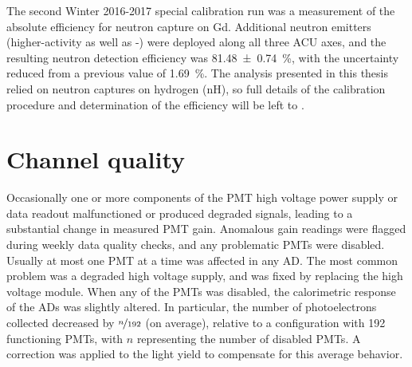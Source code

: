 The second Winter 2016-2017 special calibration run
was a measurement of the absolute efficiency for neutron capture on Gd.
Additional neutron emitters
(higher-activity \amc{} as well as -)
were deployed along all three ACU axes,
and the resulting neutron detection efficiency
was \SI{81.48\pm0.74}{\percent},
with the uncertainty reduced from a previous value of \SI{1.69}{\percent}.
The analysis presented in this thesis
relied on neutron captures on hydrogen (nH),
so full details of the calibration procedure and determination of the efficiency
will be left to \cite{reactor_flux2019}.

\section{Channel quality}
\label{sec:channel_quality}

Occasionally one or more components of the PMT high voltage power supply
or data readout malfunctioned or produced degraded signals,
leading to a substantial change in measured PMT gain.
Anomalous gain readings were flagged during weekly data quality checks,
and any problematic PMTs were disabled.
Usually at most one PMT at a time was affected in any AD.
The most common problem was a degraded high voltage supply,
and was fixed by replacing the high voltage module.
When any of the PMTs was disabled, the calorimetric response of the ADs
was slightly altered.
In particular, the number of photoelectrons collected
decreased by $\nicefrac{n}{192}$ (on average),
relative to a configuration with \num{192} functioning PMTs,
with $n$ representing the number of disabled PMTs.
A correction was applied to the light yield to compensate for this average behavior.

